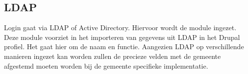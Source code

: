\subsection{LDAP}\label{ldap}

Login gaat via LDAP of Active Directory. Hiervoor wordt de  module ingezet. Deze module voorziet in het importeren van gegevens uit LDAP in het Drupal profiel. Het gaat hier om de naam en functie. Aangezien LDAP op verschillende manieren ingezet kan worden zullen de precieze velden met de gemeente afgestemd moeten worden bij de gemeente specifieke implementatie.
